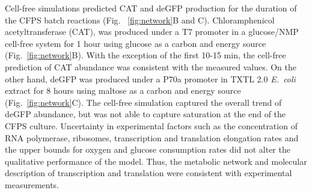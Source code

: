 \documentclass[journal=asbcd6,manuscript=article]{achemso}
\begin{document}
Cell-free simulations predicted CAT and deGFP production for the duration of the CFPS batch reactions (Fig. ~\ref{fig:network}B and C).
Chloramphenicol acetyltransferase (CAT), was produced under a T7 promoter in a glucose/NMP cell-free system \cite{2005_calhoun_BiotechnologyProgress} for 1 hour using glucose as a carbon and energy source (Fig.~\ref{fig:network}B).
With the exception of the first 10-15 min, the cell-free prediction of CAT abundance was consistent with the measured values.
On the other hand, deGFP was produced under a P70a promoter in TXTL 2.0 \textit{E.~coli} extract for 8 hours using maltose as a carbon and energy source (Fig.~\ref{fig:network}C).
The cell-free simulation captured the overall trend of deGFP abundance, but was not able to capture saturation at the end of the CFPS culture.
Uncertainty in experimental factors such as the concentration of RNA polymerase, ribosomes,
transcription and translation elongation rates and the upper bounds for oxygen and glucose consumption rates did not alter the qualitative performance of the model.
Thus, the metabolic network and molecular description of transcription and translation were consistent with experimental measurements.
\end{document}
